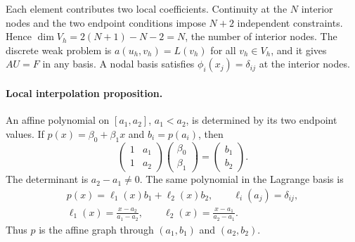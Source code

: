 \documentclass[11pt,a4paper]{article}
\begin{document}
\begin{center}
\end{center}

Each element contributes two local coefficients. Continuity at the \(N\)
interior nodes and the two endpoint conditions impose \(N+2\) independent
constraints. Hence \(\dim V_h=2(N+1)-N-2=N\), the number of interior nodes.
The discrete weak problem is \(a(u_h,v_h)=L(v_h)\) for all \(v_h\in V_h\),
and it gives \(AU=F\) in any basis. A nodal basis satisfies
\(\phi_i(x_j)=\delta_{ij}\) at the interior nodes.

\paragraph{Local interpolation proposition.}
An affine polynomial on \([a_1,a_2]\), \(a_1<a_2\), is determined by its
two endpoint values. If \(p(x)=\beta_0+\beta_1x\) and \(b_i=p(a_i)\),
then
\[
 \begin{pmatrix}1&a_1\\1&a_2\end{pmatrix}
 \begin{pmatrix}\beta_0\\\beta_1\end{pmatrix}
 =\begin{pmatrix}b_1\\b_2\end{pmatrix}.
\]
The determinant is \(a_2-a_1\ne0\). The same polynomial in the Lagrange
basis is
\[
 \begin{gathered}
 p(x)=\ell_1(x)b_1+\ell_2(x)b_2,\qquad \ell_i(a_j)=\delta_{ij},\\
 \ell_1(x)=\frac{x-a_2}{a_1-a_2},\qquad
 \ell_2(x)=\frac{x-a_1}{a_2-a_1}.
 \end{gathered}
\]
Thus \(p\) is the affine graph through \((a_1,b_1)\) and \((a_2,b_2)\).

\begin{center}
\end{center}
\end{document}
